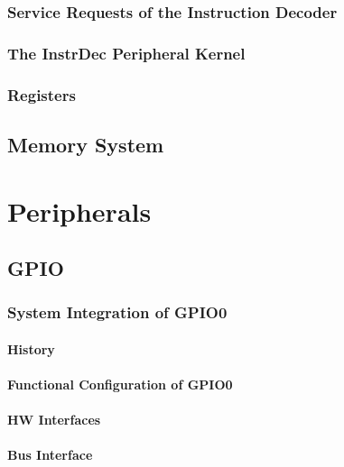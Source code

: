\subsection{Service Requests of the Instruction Decoder}

\subsection{The InstrDec Peripheral Kernel}


\subsection{Registers}


\section{Memory System}
\label{sec:memfunc01}


\chapter{Peripherals}
\section{GPIO} %
\label{sec:gpiofunc01}
\subsection{System Integration of GPIO0}
\subsubsection{History}


\subsubsection{Functional Configuration of GPIO0}


\subsubsection{HW Interfaces}


\subsubsection{Bus Interface}

